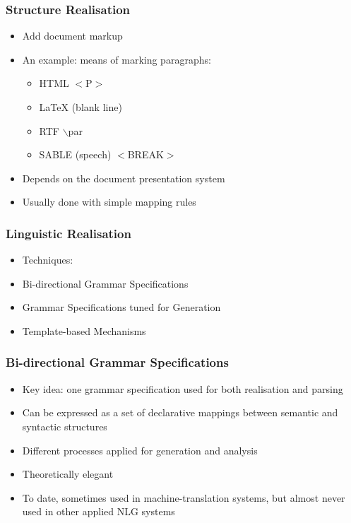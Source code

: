 \documentclass[compress,color=usenames]{beamer}
\begin{document}
\begin{frame}
\frametitle{
Structure Realisation}

\label{f27}
\begin{itemize}
\item {{Add document markup}}
\item {{An example: means of marking paragraphs:}}
\begin{itemize}
\item HTML                        \mbox{$<$}P\mbox{$>$}
\item LaTeX                         (blank line)
\item RTF                        \mbox{$\backslash$}par
\item SABLE (speech)        \mbox{$<$}BREAK\mbox{$>$}
\end{itemize}
\item {{Depends on the document presentation system}}
\item {{Usually done with simple mapping rules}}
\end{itemize}
\end{frame}

\begin{frame}
\frametitle{
Linguistic Realisation}

\label{f29}
\begin{itemize}
\item {{Techniques:}}
\item {{Bi-directional Grammar Specifications}}
\item {{Grammar Specifications tuned for Generation}}
\item {{Template-based Mechanisms}}
\end{itemize}
\end{frame}

\begin{frame}
\frametitle{
Bi-directional Grammar Specifications}

\label{f31}
\begin{itemize}
\item {{Key idea:  one grammar specification used for both realisation and parsing}}
\item {{Can be expressed as a set of declarative mappings between semantic and syntactic structures}}
\item {{Different processes applied for generation and analysis}}
\item {{Theoretically elegant}}
\item {{To date, sometimes used in machine-translation systems, but almost never used in other applied NLG systems}}
\end{itemize}
\end{frame}
\end{document}

